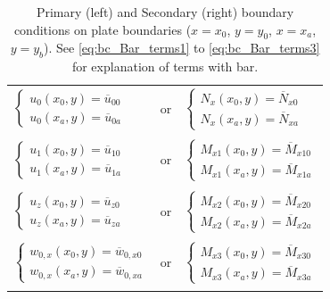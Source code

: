 \documentclass{article}
\begin{document}
\begin{table}
\centering
\caption{Primary (left) and Secondary (right) boundary conditions on plate boundaries ($x=x_0$, $y=y_0$, $x=x_a$, $y=y_b$). See \cref{eq:bc_Bar_terms1} to \cref{eq:bc_Bar_terms3} for explanation of terms with bar.}
\begin{tabular}{lcl}
$\left\{\begin{matrix} u_0(x_0, y) = \overline{u}_{00}\\ u_0(x_a, y) = \overline{u}_{0a} \end{matrix}\right.$ & or & $\left\{\begin{matrix} N_x(x_0, y) = \overline{N}_{x0}\\ N_x(x_a, y) = \overline{N}_{xa} \end{matrix}\right.$ \\
 & &  \\
$\left\{\begin{matrix} u_1(x_0, y) = \overline{u}_{10}\\ u_1(x_a, y) = \overline{u}_{1a} \end{matrix}\right.$ & or & $\left\{\begin{matrix} M_{x1}(x_0, y) = \overline{M}_{x10}\\ M_{x1}(x_a, y) = \overline{M}_{x1a} \end{matrix}\right.$ \\
 & &  \\
$\left\{\begin{matrix} u_z(x_0, y) = \overline{u}_{z0}\\ u_z(x_a, y) = \overline{u}_{za} \end{matrix}\right.$ & or & $\left\{\begin{matrix} M_{x2}(x_0, y) = \overline{M}_{x20}\\ M_{x2}(x_a, y) = \overline{M}_{x2a} \end{matrix}\right.$ \\
 & &  \\
$\left\{\begin{matrix} w_{0,x}(x_0, y) = \overline{w}_{0,x0}\\ w_{0,x}(x_a, y) = \overline{w}_{0,xa} \end{matrix}\right.$ & or & $\left\{\begin{matrix} M_{x3}(x_0, y) = \overline{M}_{x30}\\ M_{x3}(x_a, y) = \overline{M}_{x3a} \end{matrix}\right.$ \\
 & &  \\

\end{tabular}
\end{table}
\end{document}
